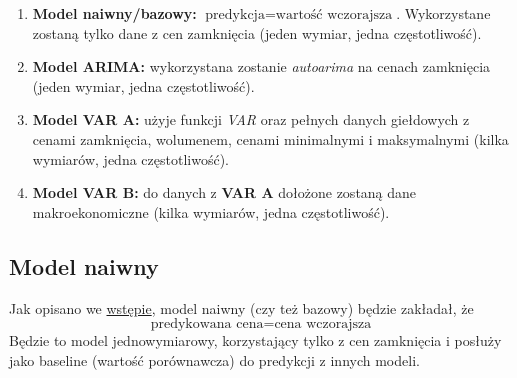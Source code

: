 \documentclass[
  polish,
  letterpaper,
  DIV=11,
  numbers=noendperiod]{scrartcl}
\providecommand{\tightlist}{%
  \setlength{\itemsep}{0pt}\setlength{\parskip}{0pt}}
\begin{document}
\begin{enumerate}
\def\labelenumi{\arabic{enumi}.}
\tightlist
\item
  \textbf{Model naiwny/bazowy:}
  \(\text{predykcja} = \text{wartość wczorajsza}\). Wykorzystane zostaną
  tylko dane z cen zamknięcia (jeden wymiar, jedna częstotliwość).
\item
  \textbf{Model ARIMA:} wykorzystana zostanie \emph{autoarima} na cenach
  zamknięcia (jeden wymiar, jedna częstotliwość).
\item
  \textbf{Model VAR A:} użyje funkcji \emph{VAR} oraz pełnych danych
  giełdowych z cenami zamknięcia, wolumenem, cenami minimalnymi i
  maksymalnymi (kilka wymiarów, jedna częstotliwość).
\item
  \textbf{Model VAR B:} do danych z \textbf{VAR A} dołożone zostaną dane
  makroekonomiczne (kilka wymiarów, jedna częstotliwość).
\end{enumerate}

\subsection{Model naiwny}\label{model-naiwny}

Jak opisano we \hyperref[cel]{wstępie}, model naiwny (czy też bazowy)
będzie zakładał, że \[\text{predykowana cena} = \text{cena wczorajsza}\]
Będzie to model jednowymiarowy, korzystający tylko z cen zamknięcia i
posłuży jako baseline (wartość porównawcza) do predykcji z innych
modeli.
\end{document}
